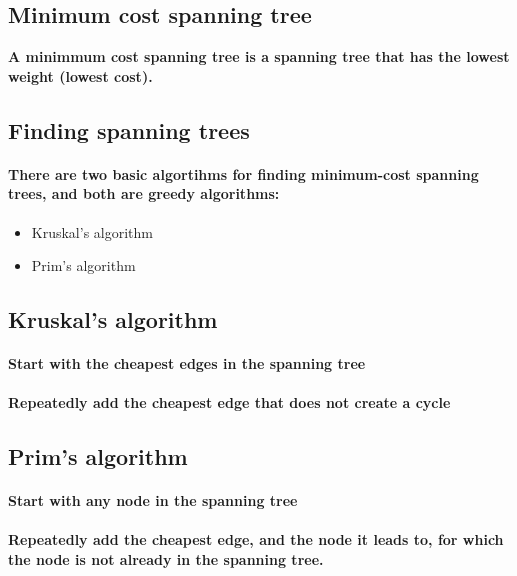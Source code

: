 \documentclass{article}
\begin{document}
\subsection{Minimum cost spanning tree}

\textbf{A minimmum cost spanning tree is a spanning tree that has the lowest weight (lowest cost).}

\subsection{Finding spanning trees}

\paragraph{There are two basic algortihms for finding minimum-cost spanning trees, and both are greedy algorithms:}

\begin{itemize}
  \item Kruskal's algorithm
  \item Prim's algorithm
\end{itemize}


\subsection{Kruskal's algorithm}

\paragraph{Start with the cheapest edges in the spanning tree}
\paragraph{Repeatedly add the cheapest edge that does not create a cycle}

\subsection{Prim's algorithm}

\paragraph{Start with any node in the spanning tree}
\paragraph{Repeatedly add the cheapest edge, and the node it leads to, for which the node is not already in the spanning tree.}
\end{document}
